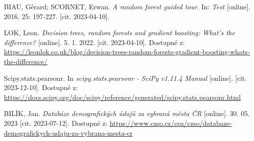 \begin{thebibliography}{1}
BIAU, Gérard; SCORNET, Erwan. \textit{A random forest guided tour}. In: \textit{Test} [online]. 2016, 25: 197-227. [cit. 2023-04-10].

LOK, Leon. \textit{Decision trees, random forests and gradient boosting: What's the difference?} [online]. 5. 1. 2022. [cit. 2023-04-10]. Dostupné z: \url{https://leonlok.co.uk/blog/decision-trees-random-forests-gradient-boosting-whats-the-difference/}

Scipy.stats.pearsonr. In \textit{scipy.stats.pearsonr - SciPy v1.11.4 Manual} [online]. [cit. 2023-12-10]. Dostupné z: \url{https://docs.scipy.org/doc/scipy/reference/generated/scipy.stats.pearsonr.html} 

BILÍK, Jan. \textit{Databáze demografických údajů za vybraná města ČR} [online]. 30. 05. 2023 [cit. 2023-07-12]. Dostupné z: \url{https://www.czso.cz/csu/czso/databaze-demografickych-udaju-za-vybrana-mesta-cr}

\end{thebibliography}
	
% 
	
	